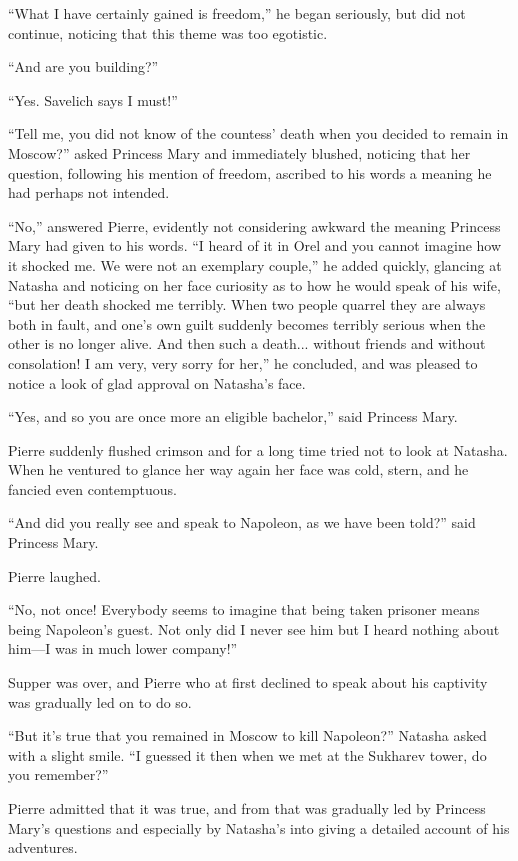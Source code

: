 ``What I have certainly gained is freedom,'' he began seriously,
but did not continue, noticing that this theme was too egotistic.

``And are you building?''

``Yes. Savelich says I must!''

``Tell me, you did not know of the countess' death when you
decided to remain in Moscow?'' asked Princess Mary and
immediately blushed, noticing that her question, following his
mention of freedom, ascribed to his words a meaning he had
perhaps not intended.

``No,'' answered Pierre, evidently not considering awkward the
meaning Princess Mary had given to his words. ``I heard of it in
Orel and you cannot imagine how it shocked me. We were not an
exemplary couple,'' he added quickly, glancing at Natasha and
noticing on her face curiosity as to how he would speak of his
wife, ``but her death shocked me terribly.  When two people
quarrel they are always both in fault, and one's own guilt
suddenly becomes terribly serious when the other is no longer
alive. And then such a death... without friends and without
consolation!  I am very, very sorry for her,'' he concluded, and
was pleased to notice a look of glad approval on Natasha's face.

``Yes, and so you are once more an eligible bachelor,'' said
Princess Mary.

Pierre suddenly flushed crimson and for a long time tried not to
look at Natasha. When he ventured to glance her way again her
face was cold, stern, and he fancied even contemptuous.

``And did you really see and speak to Napoleon, as we have been
told?''  said Princess Mary.

Pierre laughed.

``No, not once! Everybody seems to imagine that being taken
prisoner means being Napoleon's guest. Not only did I never see
him but I heard nothing about him---I was in much lower
company!''

Supper was over, and Pierre who at first declined to speak about
his captivity was gradually led on to do so.

``But it's true that you remained in Moscow to kill Napoleon?''
Natasha asked with a slight smile. ``I guessed it then when we
met at the Sukharev tower, do you remember?''

Pierre admitted that it was true, and from that was gradually led
by Princess Mary's questions and especially by Natasha's into
giving a detailed account of his adventures.

